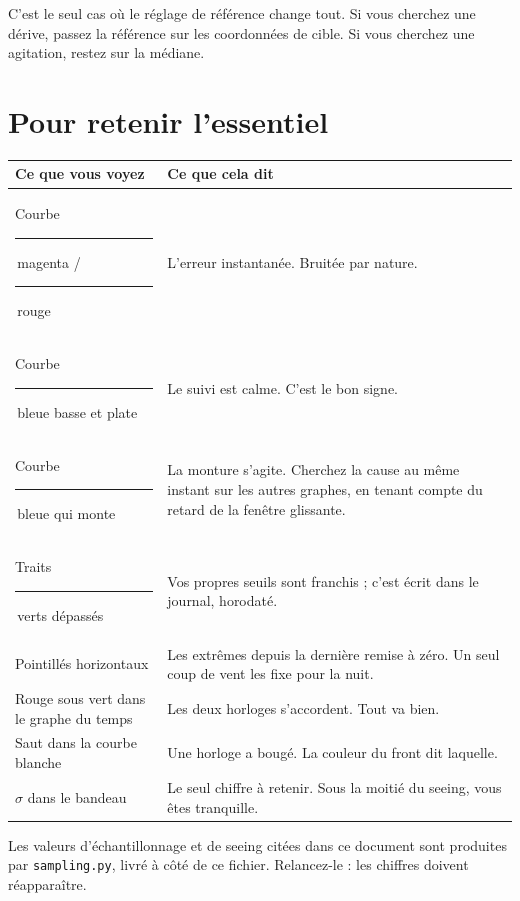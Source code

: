 \documentclass[a4paper,11pt,twoside]{report}
\newcommand{\pastille}[1]{\textcolor{#1}{\rule{2.4mm}{2.4mm}}\,}
\begin{document}
\begin{warning}
C'est le seul cas où le réglage de référence change tout. Si vous cherchez
une dérive, passez la référence sur les coordonnées de cible. Si vous
cherchez une agitation, restez sur la médiane.
\end{warning}

\chapter*{Pour retenir l'essentiel}

\begin{center}
\begin{tabularx}{\textwidth}{lX}
\toprule
\textbf{Ce que vous voyez} & \textbf{Ce que cela dit} \\
\midrule
Courbe \pastille{accentmagenta}magenta / \pastille{accentred}rouge &
L'erreur instantanée. Bruitée par nature. \\
Courbe \pastille{accentblue}bleue basse et plate &
Le suivi est calme. C'est le bon signe. \\
Courbe \pastille{accentblue}bleue qui monte &
La monture s'agite. Cherchez la cause au même instant sur les autres graphes,
en tenant compte du retard de la fenêtre glissante. \\
Traits \pastille{accentgreen}verts dépassés &
Vos propres seuils sont franchis ; c'est écrit dans le journal, horodaté. \\
Pointillés horizontaux &
Les extrêmes depuis la dernière remise à zéro. Un seul coup de vent les fixe
pour la nuit. \\
Rouge sous vert dans le graphe du temps &
Les deux horloges s'accordent. Tout va bien. \\
Saut dans la courbe blanche &
Une horloge a bougé. La couleur du front dit laquelle. \\
$\sigma$ dans le bandeau &
Le seul chiffre à retenir. Sous la moitié du seeing, vous êtes tranquille. \\
\bottomrule
\end{tabularx}
\end{center}

\vfill
\begin{center}
\textcolor{midgray}{\small Les valeurs d'échantillonnage et de seeing citées
dans ce document sont produites par \texttt{sampling.py}, livré à côté
de ce fichier. Relancez-le : les chiffres doivent réapparaître.}
\end{center}
\end{document}

